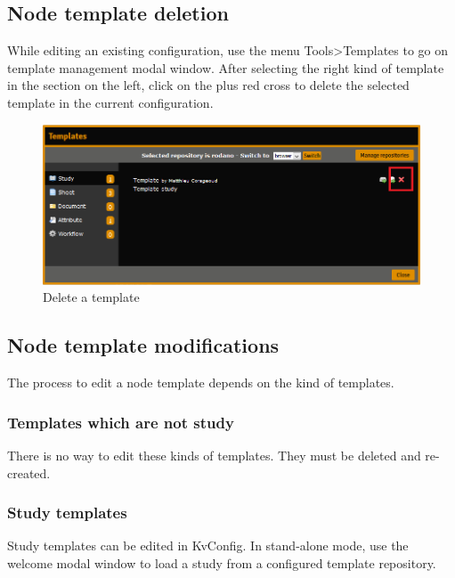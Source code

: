 \documentclass[11pt,a4paper,oneside]{article}
\begin{document}
\subsection{Node template deletion}

While editing an existing configuration, use the menu Tools\textgreater Templates to go on template management modal window. After selecting the right kind of template in the section on the left, click on the plus red cross to delete the selected template in the current configuration.\\

\begin{figure}[h]
\caption{Delete a template}
\includegraphics[width=\linewidth]{node_templates_delete_template}
\end{figure}

\subsection{Node template modifications}

The process to edit a node template depends on the kind of templates.

\subsubsection{Templates which are not study}
There is no way to edit these kinds of templates. They must be deleted and re-created.

\subsubsection{Study templates}
Study templates can be edited in KvConfig. In stand-alone mode, use the welcome modal window to load a study from a configured template repository.
\end{document}
